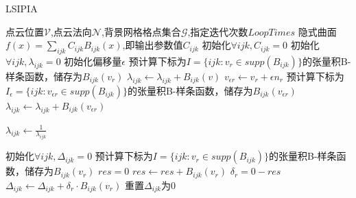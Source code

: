 \begin{algorithm}
    \caption{LSIPIA}
    \label{alg:LSIPIA}
    \begin{algorithmic}[1]
    \Require 点云位置$\mathcal{V}$,点云法向$\mathcal{N}$,背景网格格点集合$\mathcal{G}$,指定迭代次数$LoopTimes$
    \Ensure 隐式曲面$f(x) = \sum_{ijk} C_{ijk}B_{ijk}(x)$,即输出参数值$C_{ijk}$
    \State 初始化$\forall ijk,C_{ijk} = 0$
    \State 初始化$\forall ijk,\lambda_{ijk} = 0$
    \State 初始化偏移量$\epsilon$
        \State 预计算下标为$I = \{ijk : v_r \in supp(B_{ijk})\}$的张量积B-样条函数，储存为$B_{ijk}(v_r)$
            \State $\lambda_{ijk} \leftarrow \lambda_{ijk} + B_{ijk}(v)$
        \EndFor
        \State $v_{\epsilon r} \leftarrow v_r + \epsilon n_r$
        \State 预计算下标为$I_{\epsilon} = \{ijk : v_{\epsilon r} \in supp(B_{ijk})\}$的张量积B-样条函数，储存为$B_{ijk}(v_{\epsilon r})$
            \State $\lambda_{ijk} \leftarrow \lambda_{ijk} + B_{ijk}(v_{\epsilon r})$
        \EndFor
    \EndFor
    
            \State $\lambda_{ijk}\leftarrow \frac{1}{\lambda_{ijk}}$
        \EndIf
    \EndFor

    \State 初始化$\forall ijk,\Delta_{ijk} = 0$
            \State 预计算下标为$I = \{ijk : v_r \in supp(B_{ijk})\}$的张量积B-样条函数，储存为$B_{ijk}(v_r)$
            \State $res = 0$
                \State $res \leftarrow res + B_{ijk}(v_r)$ 
            \EndFor
            \State $\delta_r = 0 - res$
                \State $\Delta_{ijk}\leftarrow \Delta_{ijk} + \delta_r \cdot B_{ijk}(v_r)$ 
                \State 重置$\Delta_{ijk}$为0
            \EndFor
        \EndFor
    \EndFor

    \end{algorithmic}
\end{algorithm}


